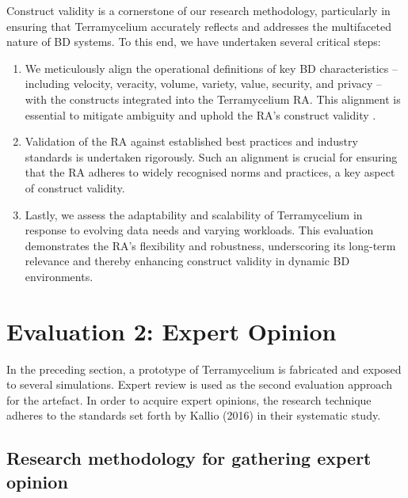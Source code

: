 \documentclass{ieeeaccess}
\begin{document}
Construct validity is a cornerstone of our research methodology, particularly in ensuring that Terramycelium accurately reflects and addresses the multifaceted nature of BD systems. To this end, we have undertaken several critical steps:

\begin{enumerate}

    \item We meticulously align the operational definitions of key BD characteristics -- including velocity, veracity, volume, variety, value, security, and privacy -- with the constructs integrated into the Terramycelium RA. This alignment is essential to mitigate ambiguity and uphold the RA's construct validity \cite{rad2017big}.

    

    

    \item Validation of the RA against established best practices and industry standards is undertaken rigorously. Such an alignment is crucial for ensuring that the RA adheres to widely recognised norms and practices, a key aspect of construct validity.

    

    \item Lastly, we assess the adaptability and scalability of Terramycelium in response to evolving data needs and varying workloads. This evaluation demonstrates the RA's flexibility and robustness, underscoring its long-term relevance and thereby enhancing construct validity in dynamic BD environments.

\end{enumerate}

\section{Evaluation 2: Expert Opinion}

In the preceding section, a prototype of Terramycelium is fabricated and exposed to several simulations. Expert review is used as the second evaluation approach for the artefact. In order to acquire expert opinions, the research technique adheres to the standards set forth by Kallio (2016) in their systematic study.

\subsection{Research methodology for gathering expert opinion}
\end{document}
